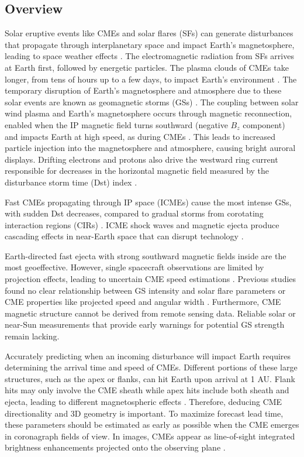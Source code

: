 \subsection{Overview}
Solar eruptive events like CMEs and solar flares (SFs) can generate disturbances that propagate through interplanetary space and impact Earth's magnetosphere, leading to space weather effects \citep{fletcher_2011, webb_2012, klein_2017, temmer_2021}. The electromagnetic radiation from SFs arrives at Earth first, followed by energetic particles. The plasma clouds of CMEs take longer, from tens of hours up to a few days, to impact Earth's environment \citep{malandraki_2018, gopalswamy_sun_sw_2022}. The temporary disruption of Earth's magnetosphere and atmosphere due to these solar events are known as geomagnetic storms (GSs) \citep{gonzalez_1994, saiz_2013, lakhina_2016}.
The coupling between solar wind plasma and Earth's magnetosphere occurs through magnetic reconnection, enabled when the IP magnetic field turns southward (negative $B_z$ component) and impacts Earth at high speed, as during CMEs \citep{dungey_1961, akasofu_1981, echer_2022}. This leads to increased particle injection into the magnetosphere and atmosphere, causing bright auroral displays. Drifting electrons and protons also drive the westward ring current responsible for decreases in the horizontal magnetic field measured by the disturbance storm time (Dst) index \citep{gonzalez_1994, saiz_2013, lakhina_2016}.

Fast CMEs propagating through IP space (ICMEs) cause the most intense GSs, with sudden Dst decreases, compared to gradual storms from corotating interaction regions (CIRs) \citep{tsurutani_1997, zhang_2007, wu_2016, borovsky_2006}. ICME shock waves and magnetic ejecta produce cascading effects in near-Earth space that can disrupt technology \citep{pulkkinen_2007}.

Earth-directed fast ejecta with strong southward magnetic fields inside are the most geoeffective. However, single spacecraft observations are limited by projection effects, leading to uncertain CME speed estimations \citep{paouris_2021, kouloumvakos_2022}. Previous studies found no clear relationship between GS intensity and solar flare parameters or CME properties like projected speed and angular width \citep{samwel_2023}. Furthermore, CME magnetic structure cannot be derived from remote sensing data. Reliable solar or near-Sun measurements that provide early warnings for potential GS strength remain lacking.

Accurately predicting when an incoming disturbance will impact Earth requires determining the arrival time and speed of CMEs. Different portions of these large structures, such as the apex or flanks, can hit Earth upon arrival at 1 AU. Flank hits may only involve the CME sheath while apex hits include both sheath and ejecta, leading to different magnetospheric effects \citep{kay_2018}. Therefore, deducing CME directionality and 3D geometry is important. To maximize forecast lead time, these parameters should be estimated as early as possible when the CME emerges in coronagraph fields of view. In images, CMEs appear as line-of-sight integrated brightness enhancements projected onto the observing plane \citep{vourlidas_2003, jackson_2010}.

